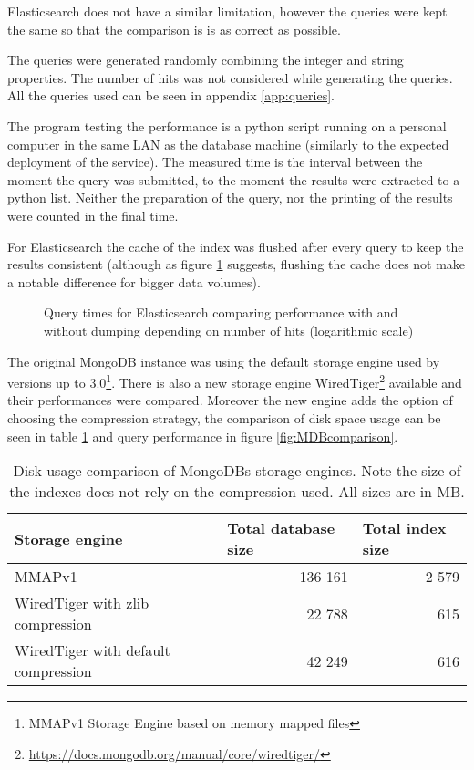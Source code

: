 Elasticsearch does not have a similar limitation, however the queries were kept
the same so that the comparison is is as correct as possible.

The queries were generated randomly combining the integer and string properties. The number of hits was not 
considered while generating the queries. All the queries used can be seen in appendix \ref{app:queries}.

The program testing the performance is a python script running on a personal computer in the same LAN as the 
database machine (similarly to the expected deployment of the service). The measured time is the interval between 
the moment the query was submitted, to the moment the results were extracted to a python list. Neither the 
preparation of the query, nor the printing of the results were counted in the final time. 

For Elasticsearch the cache of the index was flushed after every query to keep the results consistent (although as 
figure \ref{fig:EScache} suggests, flushing the cache does not make a notable difference for bigger data volumes). 

\begin{figure}[h]
	\centering
	
	\caption{Query times for Elasticsearch comparing performance with and without dumping depending on number of 
	hits (logarithmic scale)}
	\label{fig:EScache}
\end{figure}
\pagebreak
The original MongoDB instance was using the default storage engine used by versions up to 3.0\footnote{MMAPv1 
Storage Engine based on memory mapped files}. There is also a new storage engine WiredTiger\footnote{
\url{https://docs.mongodb.org/manual/core/wiredtiger/}} available and their performances were compared.
Moreover the new engine adds the option of choosing the compression strategy, the comparison of disk space usage 
can be seen in table \ref{tab:MongoComp} and query performance in figure \ref{fig:MDBcomparison}.

\begin{table}[h]
\centering
\begin{tabular}{|l|r|r|}
\hline
Storage engine                      & \multicolumn{1}{l|}{Total database size} & \multicolumn{1}{l|}{Total index size} \\ \hline
MMAPv1                              & 136 161                                  & 2 579                                 \\ \hline
WiredTiger with zlib compression    & 22 788                                   & 615                                   \\ \hline
WiredTiger with default compression & 42 249                                   & 616                                   \\ \hline
\end{tabular}
\caption{Disk usage comparison of MongoDBs storage engines. Note the size of the indexes does not rely on the
compression used. All sizes are in MB.}
\label{tab:MongoComp}
\end{table}

